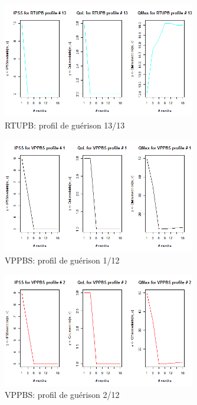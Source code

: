\begin{figure}[H]
\centering
\includegraphics[width=0.75\textwidth]{../Fig/RTUPB/rtupb-profil-post-13.png}
\caption{RTUPB: profil de guérison 13/13}
\end{figure}

%

\begin{figure}[H]
\centering
\includegraphics[width=0.75\textwidth]{../Fig/VPPBS/vppbs-profil-post-01.png}
\caption{VPPBS: profil de guérison 1/12}
\end{figure}

\begin{figure}[H]
\centering
\includegraphics[width=0.75\textwidth]{../Fig/VPPBS/vppbs-profil-post-02.png}
\caption{VPPBS: profil de guérison 2/12}
\end{figure}

